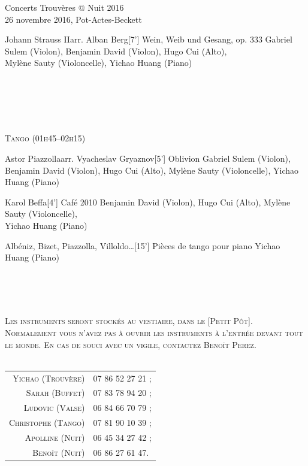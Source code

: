 \documentclass[a4paper,11pt,poets,durations]{ConcProg}
\begin{document}
{\begin{programme}{
    Concerts Trouvères @ Nuit 2016
\\  {\normalsize 26 novembre 2016, Pot-Actes-Beckett}
}
\begin{part}[]
\begin{composition}{Johann Strauss II}{arr. Alban Berg}{[7'] Wein, Weib und Gesang, op. 333}{}
      {\small Gabriel Sulem (Violon), Benjamin David (Violon), Hugo Cui (Alto),\\Mylène Sauty (Violoncelle), Yichao Huang (Piano)}
    \end{composition}\\
~\\
~\\
~\\
\begin{center}
\textsc{Tango (01h45--02h15)}
\end{center}
    \begin{composition}{Astor Piazzolla}{arr. Vyacheslav Gryaznov}{[5'] Oblivion}{}
      {\small Gabriel Sulem (Violon), Benjamin David (Violon), Hugo Cui (Alto), Mylène Sauty (Violoncelle), Yichao Huang (Piano)}
    \end{composition}
    \begin{composition}{Karol Beffa}{}{[4'] Café 2010}{}
      {\small Benjamin David (Violon), Hugo Cui (Alto), Mylène Sauty (Violoncelle),\\Yichao Huang (Piano)}
    \end{composition}
    \begin{composition}{Albéniz, Bizet, Piazzolla, Villoldo\dots}{}{[15'] Pièces de tango pour piano}{}
      {\small Yichao Huang (Piano)}
    \end{composition}\\
~\\
~\\
\begin{center}
\textsc{Les instruments seront stockés au vestiaire, dans le [Petit Pôt].\\Normalement vous n'avez pas à ouvrir les instruments à l'entrée devant tout le monde. En cas de souci avec un vigile, contactez Benoît Perez.}\\
~\\
\begin{tabular}{rl}
\textsc{Yichao (Trouvère)} & \textsc{07 86 52 27 21 ;}\\
\textsc{Sarah (Buffet)} & \textsc{07 83 78 94 20 ;}\\
\textsc{Ludovic (Valse)} & \textsc{06 84 66 70 79 ;}\\
\textsc{Christophe (Tango)} & \textsc{07 81 90 10 39 ;}\\
\textsc{Apolline (Nuit)} & \textsc{06 45 34 27 42 ;}\\
\textsc{Benoît (Nuit)} & \textsc{06 86 27 61 47.}
\end{tabular}
\end{center}
  \end{part}
\end{programme}
}
\end{document}
